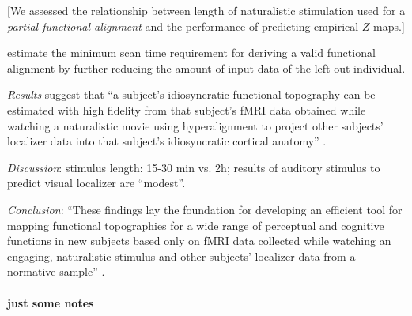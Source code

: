 [We assessed the relationship between length of naturalistic stimulation used
for a \textit{partial functional alignment} and the performance of predicting
empirical $Z$-maps.]

%
estimate the minimum scan time requirement for deriving a valid functional
alignment by further reducing the amount of input data of the left-out
individual.

%
\textit{Results} suggest that ``a subject's idiosyncratic functional topography
can be estimated with high fidelity from that subject's fMRI data obtained while
watching a naturalistic movie using hyperalignment to project other subjects’
localizer data into that subject's idiosyncratic cortical anatomy''
\citep{jiahui2020predicting}.

%
\textit{Discussion}: stimulus length: 15-30 min vs. 2h;  results of auditory
stimulus to predict visual localizer are ``modest''.

%
\textit{Conclusion}: ``These findings lay the foundation for developing an
efficient tool for mapping functional topographies for a wide range of
perceptual and cognitive functions in new subjects based only on fMRI data
collected while watching an engaging, naturalistic stimulus and other subjects'
localizer data from a normative sample'' \citep{jiahui2020predicting}.


\paragraph{just some notes}

